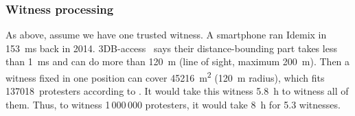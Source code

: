 

\subsubsection{Witness processing}

As above, assume we have one trusted witness.
A smartphone ran Idemix in \SI{153}{\milli\second} back in 2014.
3DB-access~\cite{3db-access} says their distance-bounding part takes less than 
\SI{1}{\milli\second} and can do more than \SI{120}{\metre} (line of sight, 
maximum \SI{200}{\metre}).
Then a witness fixed in one position can cover \SI{45216}{\square\metre} 
(\SI{120}{\metre} radius), which fits 137018~protesters according to 
\textcite{2016DemonstrationsInSeoul}.
It would take this witness \SI{5.8}{\hour} to witness all of them.
Thus, to witness 1\,000\,000 protesters, it would take \SI{8}{\hour} for 5.3 
witnesses.

